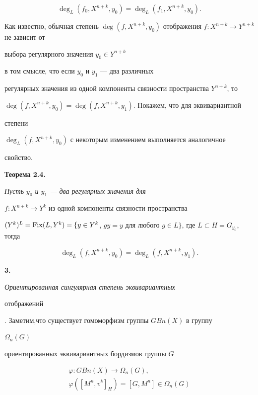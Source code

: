 $$ 


\deg_L(f_0,X^{n+k},y_0)=\deg_L(f_1,X^{n+k},y_0). 


$$ 


\medskip 


 


 


Как известно, обычная степень $\deg(f,X^{n+k},y_0)$ отображения $f:X^{n+k}\to 


Y^{n+k}$ не зависит от 


выбора регулярного значения $y_0\in Y^{n+k}$ 


в том смысле, что если $y_0$ и $y_1$ --- два различных 


регулярных значения из одной компоненты связности пространства $Y^{n+k}$, то 


$\deg(f,X^{n+k},y_0)=\deg(f,X^{n+k},y_1)$. Покажем, что для эквивариантной 


степени 


$\deg_L(f,X^{n+k},y_0)$ с некоторым изменением выполняется аналогичное 


свойство. 


\medskip 


 


{\bf Теорема 2.4.} {\it Пусть $y_0$ и $y_1$ --- два регулярных значения для 


$f:X^{n+k}\to Y^k$ из одной компоненты связности пространства 


$(Y^k)^L=\Fix(L,Y^k)=\{y\in Y^k$, $gy=y$ для любого $g\in L\}$, где $L\subset 


H=G_{y_0}$, тогда} 


$$ 


\deg_L(f,X^{n+k},y_0)=\deg_L(f,X^{n+k},y_1). 


$$ 


\medskip 


 


 


{\bf 3.} {\it Ориентированная сингулярная степень эквивариантных 


отображений}. Заметим,что существует гомоморфизм группы $GBn(X)$ в группу 


$\Omega_n(G)$ 


ориентированных эквивариантных бордизмов группы $G$ 


\begin{gather*} 


\varphi:GBn(X)\to\Omega_n(G),\\ 


\varphi([M^n,v^k]_H)=[G,M^n]\in\Omega_n(G) 


\end{gather*} 


